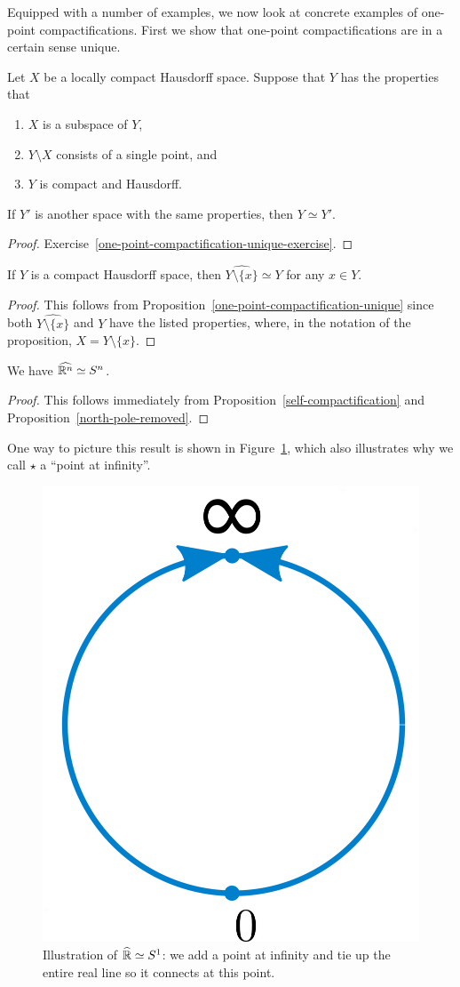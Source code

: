 Equipped with a number of examples, we now look at concrete examples of one-point compactifications. First we show that one-point compactifications are in a certain sense unique.
\begin{prop}
  \label{one-point-compactification-unique}
  Let $X$ be a locally compact Hausdorff space. Suppose that $Y$ has the properties that
  \begin{enumerate}
    \item $X$ is a subspace of $Y$,
    \item $Y \setminus X$ consists of a single point, and
    \item $Y$ is compact and Hausdorff.
  \end{enumerate}
  If $Y'$ is another space with the same properties, then $Y \simeq Y'$.
\end{prop}
\begin{proof}
  Exercise~\ref{one-point-compactification-unique-exercise}.
\end{proof}

\begin{prop}
  \label{self-compactification}
  If $Y$ is a compact Hausdorff space, then $\hat{Y \setminus \{x\}} \simeq Y$ for any $x \in Y$.
\end{prop}
\begin{proof}
  This follows from Proposition~\ref{one-point-compactification-unique} since both $\hat{Y \setminus \{x\}}$ and $Y$ have the listed properties, where, in the notation of the proposition, $X = Y \setminus \{x\}$.
\end{proof}

\begin{prop}
  We have $\widehat{\mathbb{R}^n} \simeq S^n$.
\end{prop}
\begin{proof}
  This follows immediately from Proposition~\ref{self-compactification} and Proposition~\ref{north-pole-removed}.
\end{proof}
One way to picture this result is shown in Figure~\ref{one-point-compactification-figure}, which also illustrates why we call $\star$ a ``point at infinity''.
\begin{figure}
  \centering
  \includegraphics[width=.3\linewidth]{images/one-point-compactification}
  \caption{Illustration of $\widehat{\mathbb{R}} \simeq S^1$: we add a point at infinity and tie up the entire real line so it connects at this point.}
  \label{one-point-compactification-figure}
\end{figure}

